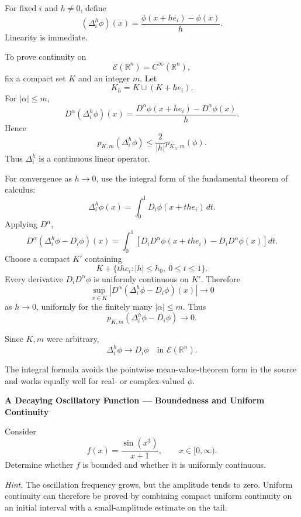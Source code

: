 \begin{solution}
For fixed \(i\) and \(h\neq0\), define
\[
(\Delta_i^h\phi)(x)
=
\frac{\phi(x+he_i)-\phi(x)}{h}.
\]
Linearity is immediate.

To prove continuity on
\[
\mathcal E(\mathbb R^n)=C^\infty(\mathbb R^n),
\]
fix a compact set \(K\) and an integer \(m\). Let
\[
K_h=K\cup(K+he_i).
\]
For \(|\alpha|\le m\),
\[
D^\alpha(\Delta_i^h\phi)(x)
=
\frac{
D^\alpha\phi(x+he_i)-D^\alpha\phi(x)
}{h}.
\]
Hence
\[
p_{K,m}(\Delta_i^h\phi)
\le
\frac{2}{|h|}
p_{K_h,m}(\phi).
\]
Thus \(\Delta_i^h\) is a continuous linear operator.

For convergence as \(h\to0\), use the integral form of the fundamental theorem of calculus:
\[
\Delta_i^h\phi(x)
=
\int_0^1
D_i\phi(x+the_i)\,dt.
\]
Applying \(D^\alpha\),
\[
D^\alpha(\Delta_i^h\phi-D_i\phi)(x)
=
\int_0^1
\left[
D_iD^\alpha\phi(x+the_i)
-
D_iD^\alpha\phi(x)
\right]dt.
\]
Choose a compact \(K'\) containing
\[
K+\{the_i:|h|\le h_0,\ 0\le t\le1\}.
\]
Every derivative \(D_iD^\alpha\phi\) is uniformly continuous on \(K'\). Therefore
\[
\sup_{x\in K}
|D^\alpha(\Delta_i^h\phi-D_i\phi)(x)|
\longrightarrow0
\]
as \(h\to0\), uniformly for the finitely many \(|\alpha|\le m\). Thus
\[
p_{K,m}(\Delta_i^h\phi-D_i\phi)\to0.
\]

Since \(K,m\) were arbitrary,
\[
\boxed{
\Delta_i^h\phi\longrightarrow D_i\phi
\quad\text{in }\mathcal E(\mathbb R^n).
}
\]

The integral formula avoids the pointwise mean-value-theorem form in the source and works
equally well for real- or complex-valued \(\phi\).
\end{solution}


\begin{problem}[CP-II-0544]
\label{prob:cp-ii-0544}
\textbf{A Decaying Oscillatory Function --- Boundedness and Uniform Continuity}

\hspace*{1.5em}Consider
\[
f(x)=\frac{\sin(x^3)}{x+1},
\qquad x\in[0,\infty).
\]
Determine whether \(f\) is bounded and whether it is uniformly continuous.

\medskip
\noindent\emph{Hint.} The oscillation frequency grows, but the amplitude tends to zero. Uniform
continuity can therefore be proved by combining compact uniform continuity on
an initial interval with a small-amplitude estimate on the tail.
\end{problem}

